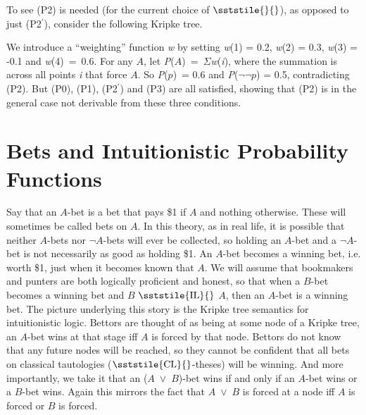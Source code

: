 To see (P2) is needed (for the current choice of {\small \(\sststile{}{}\)}), as opposed to just (P2\(^\prime\)), consider the following Kripke tree.

\ConProbKripkeTree

\noindent We introduce a ``weighting'' function \textit{w} by setting \textit{w}(1) = 0.2, \textit{w}(2) = 0.3, \textit{w}(3) = -0.1 and \textit{w}(4)~=~0.6. For any \(A\), let \textit{P}(\(A\))~=~${\Sigma}$\textit{w}(\textit{i}), where the summation is across all points \textit{i} that force \(A\). So \textit{P}(\(p\))~= 0.6 and \textit{P}(${\lnot}{\lnot}$\(p\)) = 0.5, contradicting (P2). But (P0), (P1), (P2\(^\prime\)) and (P3) are all satisfied, showing that (P2) is in the general case not derivable from these three conditions.

\section{Bets and Intuitionistic Probability Functions}
Say that an \(A\)\nobreakdash-bet is a bet that pays \$1 if \(A\) and nothing otherwise. These will sometimes be called bets on \(A\). In this theory, as in real life, it is possible that neither \(A\)\nobreakdash-bets nor ${\lnot}$\(A\)\nobreakdash-bets will ever be collected, so holding an \(A\)\nobreakdash-bet and a ${\lnot}$\(A\)\nobreakdash-bet is not necessarily as good as holding \$1. An \(A\)\nobreakdash-bet becomes a winning bet, i.e. worth \$1, just when it becomes known that \(A\). We will assume that bookmakers and punters are both logically proficient and honest, so that when a \(B\)\nobreakdash-bet becomes a winning bet and \(B\) {\small \(\sststile{\mathrm{IL}}{}\)} \(A\), then an \(A\)\nobreakdash-bet is a winning bet. The picture underlying this story is the Kripke tree semantics for intuitionistic logic. Bettors are thought of as being at some node of a Kripke tree, an \(A\)\nobreakdash-bet wins at that stage iff \(A\) is forced by that node. Bettors do not know that any future nodes will be reached, so they cannot be confident that all bets on classical tautologies ({\small \(\sststile{\mathrm{CL}}{}\)}{}-theses) will be winning. And more importantly, we take it that an (\(A\)~${\vee}$~\(B\))\nobreakdash-bet wins if and only if an \(A\)\nobreakdash-bet wins or a \(B\)\nobreakdash-bet wins. Again this mirrors the fact that \(A\)~${\vee}$~\(B\) is forced at a node iff \(A\) is forced or \(B\) is forced.

